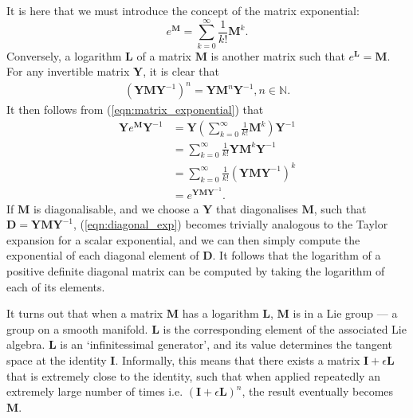     It is here that we must introduce the concept of the matrix exponential:
        \begin{equation}
          e^{\mathbf{M}} = \sum_{k=0}^{\infty}\frac{1}{k!}\mathbf{M}^k. \label{eqn:matrix_exponential}
        \end{equation}
                Conversely, a logarithm $\mathbf{L}$ of a matrix $\mathbf{M}$ is another matrix such that $e^\mathbf{L} = \mathbf{M}$. For any invertible matrix $\mathbf{Y}$, it is clear that
                \begin{gather}
                    (\mathbf{YM}\mathbf{Y}^{-1})^n = \mathbf{Y}\mathbf{M}^n\mathbf{Y}^{-1}, n \in \mathbb{N}.
                \end{gather}
                It then follows from (\ref{eqn:matrix_exponential}) that
                \begin{align}
                    \mathbf{Y}e^{\mathbf{M}}\mathbf{Y}^{-1} &= \mathbf{Y}\left(\sum_{k=0}^{\infty}\frac{1}{k!}\mathbf{M}^k\right)\mathbf{Y}^{-1} \\
                                                            &= \sum_{k=0}^{\infty}\frac{1}{k!}\mathbf{Y}\mathbf{M}^k\mathbf{Y}^{-1} \\
                                                            &= \sum_{k=0}^{\infty}\frac{1}{k!}(\mathbf{YM}\mathbf{Y}^{-1})^k \label{eqn:diagonal_exp} \\
                                                            &= e^{\mathbf{YM}\mathbf{Y}^{-1}}.
                \end{align}
                If $\mathbf{M}$ is diagonalisable, and we choose a $\mathbf{Y}$ that diagonalises $\mathbf{M}$, such that $\mathbf{D} = \mathbf{YMY}^{-1}$, (\ref{eqn:diagonal_exp}) becomes trivially analogous to the Taylor expansion for a scalar exponential, and we can then simply compute the exponential of each diagonal element of $\mathbf{D}$. It follows that the logarithm of a positive definite diagonal matrix can be computed by taking the logarithm of each of its elements.
                
                It turns out that when a matrix $\mathbf{M}$ has a logarithm $\mathbf{L}$, $\mathbf{M}$ is in a Lie group --- a group on a smooth manifold. $\mathbf{L}$ is the corresponding element of the associated Lie algebra. $\mathbf{L}$ is an `infinitessimal generator', and its value determines the tangent space at the identity $\mathbf{I}$. Informally, this means that there exists a matrix $\mathbf{I} + \epsilon \mathbf{L}$ that is extremely close to the identity, such that when applied repeatedly an extremely large number of times i.e. $(\mathbf{I} + \epsilon \mathbf{L})^n$, the result eventually becomes $\mathbf{M}$.
        
